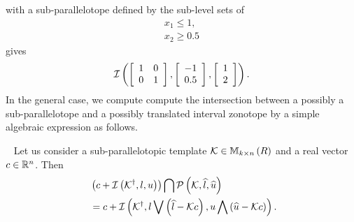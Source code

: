 with a sub-parallelotope defined by the sub-level sets of
%
\begin{align*}
  x_1\leq 1,\\
  x_2\geq 0.5
\end{align*}
%
gives
%
\[
\mathit{\operatorname{\mathcal{I}}}\left(\left[\begin{array}{l
        l}1 & 0 \\ 0 &
      1\end{array}\right],\left[\begin{array}{c}-1\\ 0.5\end{array}\right],\left[\begin{array}{c}1\\ 2\end{array}\right]\right).
\]
%
In the general case, we compute compute the intersection between a
possibly a sub-parallelotope and a possibly translated interval
zonotope by a simple algebraic expression as follows.
%
\begin{lemma}~\label{lem:motivation}
  Let us consider a sub-parallelotopic template
  $\mathcal{K}\in\mathbb{M}_{k\times n}\left(R\right)$ and a real vector
  $c\in\mathbb{R}^n$.  Then
%
\begin{align}~\label{eqn:motivation}
& \left(c+\mathit{\operatorname{\mathcal{I}}}\left({\mathcal{K}}^\dagger,l,u\right)\right)\bigcap\mathcal{P}\left(\mathcal{K},\widehat{l},\widehat{u}\right)\nonumber\\
& =c+\mathit{\operatorname{\mathcal{I}}}\left({\mathcal{K}}^\dagger,l\bigvee \left(\widehat{l}-\mathcal{K}c\right),u\bigwedge \left(\widehat{u}-\mathcal{K}c\right)\right).
\end{align}
%
\end{lemma}
%
